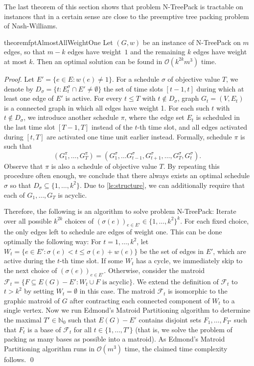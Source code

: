 \documentclass[runningheads]{llncs}
\newcommand{\NN}{\mathbb{N}}
\newcommand{\set}[1]{\{ #1 \}}
\newcommand{\fromto}[2]{\set{#1, \ldots, #2}}
\newcommand{\bigO}{\mathcal{O}}
\newcommand{\xxxNTP}{{\sc N-TreePack}}
\begin{document}
The last theorem of this section shows that problem {\xxxNTP} is tractable on instances that in 
a certain sense are close to the preemptive tree packing problem of Nash-Williams. 
\begin{restatable}{theorem}{fptAlmostAllWeightOne}
\label{th:fpt_almost_all_weight_one}
Let $(G,w)$ be an instance of {\xxxNTP} on $m$ edges, so that $m-k$ edges have weight~$1$ and 
the remaining $k$ edges have weight at most $k$. 
Then an optimal solution can be found in $\bigO(k^{2k}m^3)$ time.
\end{restatable}
\begin{proof}
Let $E'=\set{e\in E: w(e)\ne1}$. 
For a schedule $\sigma$ of objective value $T$, we denote by $D_\sigma= \set{t: E_t^\sigma\cap E'\ne\emptyset}$ 
the set of time slots $[t-1,t]$ during which at least one edge of $E'$ is active. 
For every $t\le T$ with $t\notin D_\sigma$, graph $G_t=(V,E_t)$ is a connected graph in which 
all edges have weight 1.  
For each such $t$ with $t \not\in D_\sigma$, we introduce another schedule $\pi$, where the edge set $E_t$ is scheduled in the last time 
slot $[T-1, T]$ instead of the $t$-th time slot, and all edges activated during $[t, T]$ are activated 
one time unit earlier instead. Formally, schedule $\pi$ is such that
\[(G^\pi_1,\dots, G^\pi_T) = (G^\sigma_1, \dots G^\sigma_{t-1}, G^\sigma_{t+1}, \dots, G^\sigma_T, G^\sigma_t). \]
Observe that $\pi$ is also a schedule of objective value $T$. 
By repeating this procedure often enough, we conclude that there always exists an optimal schedule $\sigma$ so that $D_\sigma \subseteq \fromto{1}{k^2}$. 
Due to \cref{le:structure}, we can additionally require that each of $G_1, \dots, G_T$ is acyclic.

Therefore, the following is an algorithm to solve problem {\xxxNTP}: 
Iterate over all possible $k^{2k}$ choices of $(\sigma(e))_{e \in E'} \in \fromto{1}{k^2}^k$. 
For each fixed choice, the only edges left to schedule are edges of weight one. 
This can be done optimally the following way: 
For $t = 1,\dots, k^2$, let $W_t = \set{e \in E' : \sigma(e) < t \leq \sigma(e) + w(e)}$ be the set of edges in $E'$, which are active during the $t$-th time slot. 
If some $W_t$ has a cycle, we immediately skip to the next choice of $(\sigma(e))_{e \in E'}$. 
Otherwise, consider the matroid $\mathcal{F}_t = \set{F \subseteq E(G)-E' : W_t \cup F \text{ is acyclic}}$. 
We extend the definition of $\mathcal{F}_t$ to $t > k^2$ by setting $W_t = \emptyset$ in this case. 
The matroid $\mathcal{F}_t$ is isomorphic to the graphic matroid of $G$ after contracting each connected 
component of $W_t$ to a single vertex. 
Now we run Edmond's Matroid Partitioning algorithm \cite{edmonds1965minimum} to determine the 
maximal $T'\in\NN_0$ such that $E(G)-E'$ contains disjoint sets $F_1, \dots, F_{T'}$ such that $F_t$ 
is a base of $\mathcal{F}_t$ for all $t \in \fromto{1}{T'}$ (that is, we solve the problem of packing as 
many bases as possible into a matroid). 
As Edmond's Matroid Partitioning algorithm runs in $\bigO(m^3)$ time, the claimed time complexity follows.
\qed
\end{proof}
\end{document}
